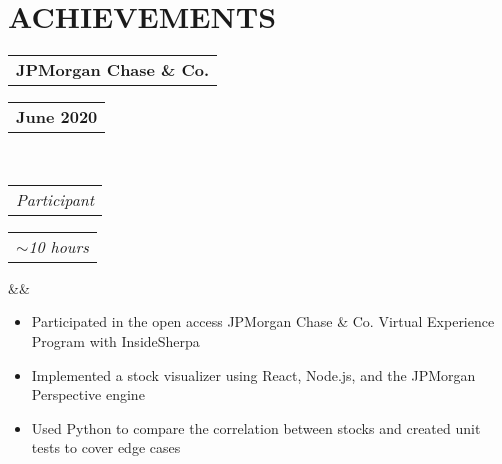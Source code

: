 \documentclass[11pt,letterpaper,sans]{moderncv}        %
\makeatletter
\newcommand*{\customcventry}[7][.25em]{
  \begin{tabular}{@{}l} 
    {\bfseries #4}
  \end{tabular}
  \hfill%
  \begin{tabular}{l@{}}
     {\bfseries #5}
  \end{tabular} \\
  \begin{tabular}{@{}l} 
    {\itshape #3}
  \end{tabular}
  \hfill%
  \begin{tabular}{l@{}}
     {\itshape #2}
  \end{tabular}
  \ifx&#7&%
  \else{\\%
    \begin{minipage}{\maincolumnwidth}%
      #7%
    \end{minipage}}\fi%
  \par\addvspace{#1}}
\makeatother
\begin{document}
\vspace*{-4mm}

\section{ACHIEVEMENTS}
\customcventry{\small{$\sim$10 hours}}{\small{Participant}}{JPMorgan Chase \& Co.}{June 2020}{e}{}
\begin{itemize}
    \item Participated in the open access JPMorgan Chase \& Co. Virtual Experience Program with InsideSherpa
    \item Implemented a stock visualizer using React, Node.js, and the JPMorgan Perspective engine
    \item Used Python to compare the correlation between stocks and created unit tests to cover edge cases
\end{itemize}

\nocite{*}



\end{document}

